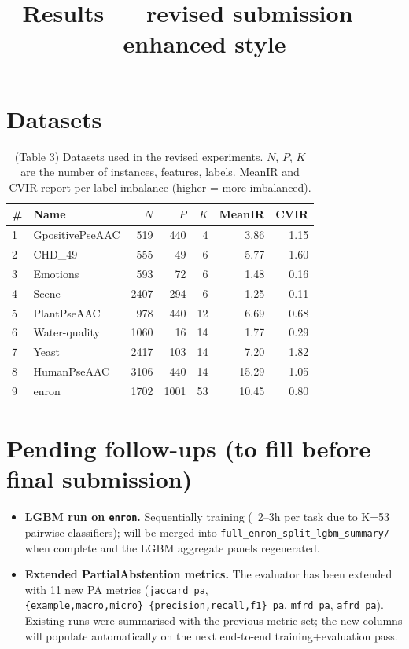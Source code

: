 \documentclass[11pt]{article}
\title{Results --- revised submission --- enhanced style}
\author{}
\date{}
\begin{document}
\maketitle

\section{Datasets}

\begin{table}[!htbp]
\centering
\begin{tabular}{l|l|r|r|r|r|r}
\hline
\# & Name & $N$ & $P$ & $K$ & MeanIR & CVIR \\
\hline
1 & GpositivePseAAC & 519 & 440 & 4 & 3.86 & 1.15 \\
2 & CHD\_49 & 555 & 49 & 6 & 5.77 & 1.60 \\
3 & Emotions & 593 & 72 & 6 & 1.48 & 0.16 \\
4 & Scene & 2407 & 294 & 6 & 1.25 & 0.11 \\
5 & PlantPseAAC & 978 & 440 & 12 & 6.69 & 0.68 \\
6 & Water-quality & 1060 & 16 & 14 & 1.77 & 0.29 \\
7 & Yeast & 2417 & 103 & 14 & 7.20 & 1.82 \\
8 & HumanPseAAC & 3106 & 440 & 14 & 15.29 & 1.05 \\
9 & enron & 1702 & 1001 & 53 & 10.45 & 0.80 \\
\hline
\end{tabular}
\caption{(Table 3) Datasets used in the revised experiments. $N$, $P$, $K$ are the number of instances, features, labels. MeanIR and CVIR report per-label imbalance (higher = more imbalanced).}
\label{tab:datasets_revised}
\end{table}

\section*{Pending follow-ups (to fill before final submission)}
\begin{itemize}
  \item \textbf{LGBM run on \texttt{enron}.} Sequentially training (~2--3h
        per task due to K=53 pairwise classifiers); will be merged into
        \texttt{full\_enron\_split\_lgbm\_summary/} when complete and the
        LGBM aggregate panels regenerated.
  \item \textbf{Extended PartialAbstention metrics.} The evaluator has been
        extended with 11 new PA metrics
        (\texttt{jaccard\_pa}, \texttt{\{example,macro,micro\}\_\{precision,recall,f1\}\_pa},
        \texttt{mfrd\_pa}, \texttt{afrd\_pa}). Existing runs were summarised
        with the previous metric set; the new columns will populate
        automatically on the next end-to-end training+evaluation pass.
\end{itemize}
\end{document}
